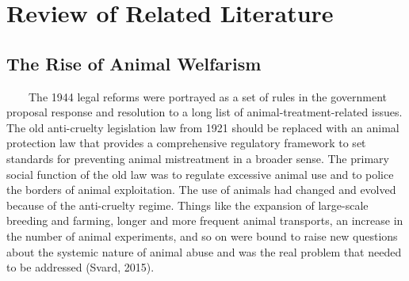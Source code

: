 \chapter{Review of Related Literature}
\label{sec:relatedlit}


\begin{comment}
%
%
Guide on Writing your RRL chapter
 
1. Identify the keywords with respect to your research
      One keyword = One document section
                Examples: 2.1 Story Generation Systems
			 2.2 Knowledge Representation

2.  Find references using these keywords

3.  For each of the references that you find,
        Check: Is it relevant to your research?
        Use their references to find more relevant works.

4. Identify a set of criteria for comparison.
       It will serve as a guide to help you focus on what to look for

5. Write a summary focusing on -
       What: A short description of the work
       How: A summary of the approach it utilized
       Findings: If applicable, provide the results
        Why: Relevance to your work

6. At the end of each section,  show a Table of Comparison of the related works 
   and your proposed project/system

\end{comment}

\section{The Rise of Animal Welfarism}
~~~~The 1944 legal reforms were portrayed as a set of rules in the government proposal response and resolution to a long list of animal-treatment-related issues. The old anti-cruelty legislation law from 1921 should be replaced with an animal protection law that provides a comprehensive regulatory framework to set standards for preventing animal mistreatment in a broader sense.
The primary social function of the old law was to regulate excessive animal use and to police the borders of animal exploitation. The use of animals had changed and evolved because of the anti-cruelty regime. Things like the expansion of large-scale breeding and farming, longer and more frequent animal transports, an increase in the number of animal experiments, and so on were bound to raise new questions about the systemic nature of animal abuse and was the real problem that needed to be addressed (Svard, 2015).

